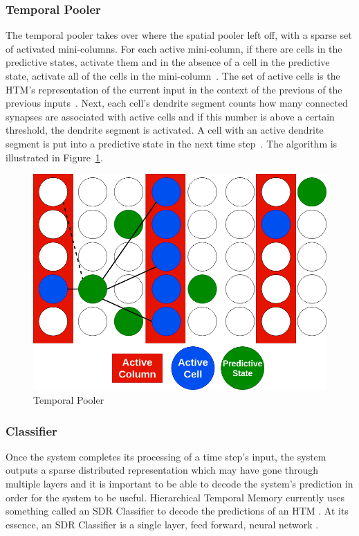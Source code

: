 \documentclass[oneside,12pt,openany]{book}
\begin{document}
	
	\subsubsection{Temporal Pooler}

	The temporal pooler takes over where the spatial pooler left off, with a sparse set of activated mini-columns. For each active mini-column, if there are cells in the predictive states, activate them and in the absence of a cell in the predictive state, activate all of the cells in the mini-column~\cite{Whitepaper}. The set of active cells is the HTM's representation of the current input in the context of the previous of the previous inputs~\cite{BAMI}. Next, each cell's dendrite segment counts how many connected synapses are associated with active cells and if this number is above a certain threshold, the dendrite segment is activated. A cell with an active dendrite segment is put into a predictive state in the next time step~\cite{BAMI}. The algorithm is illustrated in Figure~\ref{fig:TemporalPooler}.
	
	

	\begin{figure}[hbt!]
		\centering
		\includegraphics[width=.8\linewidth]{images/TemporalPooler.png}
		\caption{Temporal Pooler}
		\label{fig:TemporalPooler}
	\end{figure}

	\subsubsection{Classifier}
	
	Once the system completes its processing of a time step's input, the system outputs a sparse distributed representation which may have gone through multiple layers and it is important to be able to decode the system's prediction in order for the system to be useful. Hierarchical Temporal Memory currently uses something called an SDR Classifier to decode the predictions of an HTM \cite{Dillon}. At its essence, an SDR Classifier is a single layer, feed forward, neural network \cite{Dillon}.
	
\end{document}
